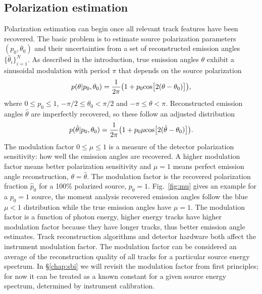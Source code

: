 \subsection{Polarization estimation}
\label{sec:polest}
Polarization estimation can begin once all relevant track features have been recovered. The basic problem is to estimate source polarization parameters $(p_0,\theta_0)$ and their uncertainties from a set of reconstructed emission angles $\{\hat{\theta}_i\}_{i=1}^N$.  As described in the introduction, true emission angles $\theta$ exhibit a sinusoidal modulation with period $\pi$ that depends on the source polarization
\begin{equation} \label{eqn:likelihood}
    p(\theta|p_0,\theta_0) = \frac{1}{2\pi}\big(1 + p_0{\rm cos}\big[2(\theta - \theta_0)\big]\big),
\end{equation}
where $0 \leq p_0 \leq 1$, $-\pi/2 \leq \theta_0 < \pi/2$ and $-\pi \leq \theta < \pi$. Reconstructed emission angles $\hat{\theta}$ are imperfectly recovered, so these follow an adjusted distribution
\begin{equation} \label{eqn:likelihoodmu}
    p(\hat{\theta}|p_0,\theta_0) = \frac{1}{2\pi}\big(1 + p_0\mu{\rm cos}\big[2(\hat{\theta} - \theta_0)\big]\big).
\end{equation}
The modulation factor $0 \leq \mu \leq 1$ is a measure of the detector polarization sensitivity: how well the emission angles are recovered. A higher modulation factor means better polarization sensitivity and $\mu = 1$ means perfect emission angle reconstruction, $\theta = \hat{\theta}$. The modulation factor is the recovered polarization fraction $\hat{p}_0$ for a 100\% polarized source, $p_0 = 1$. Fig.~\ref{fig:mu} gives an example for a $p_0 = 1$ source, the moment analysis recovered emission angles follow the blue $\mu < 1$ distribution while the true emission angles have $\mu = 1$. The modulation factor is a function of photon energy, higher energy tracks have higher modulation factor because they have longer tracks, thus better emission angle estimates. Track reconstruction algorithms and detector hardware both affect the instrument modulation factor. The modulation factor can be considered an average of the reconstruction quality of all tracks for a particular source energy spectrum.  In \S\ref{chap:sbi} we will revisit the modulation factor from first principles; for now it can be treated as a known constant for a given source energy spectrum, determined by instrument calibration.

